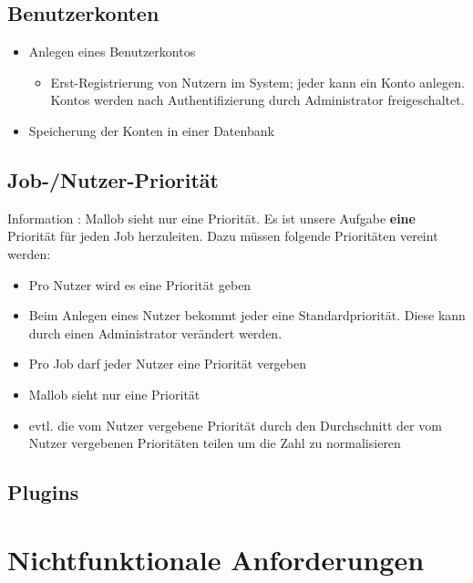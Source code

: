 
\subsection{Benutzerkonten}

\begin{itemize}
    \item Anlegen eines Benutzerkontos
    \begin{itemize}
        \item Erst-Registrierung von Nutzern im System; jeder kann ein Konto anlegen. Kontos werden nach Authentifizierung durch Administrator freigeschaltet.
    \end{itemize}
    \item Speicherung der Konten in einer Datenbank
\end{itemize}



\subsection{Job-/Nutzer-Priorität}
Information : Mallob sieht nur eine Priorität. Es ist unsere Aufgabe \textbf{eine} Priorität für jeden Job herzuleiten. Dazu müssen folgende Prioritäten vereint werden: 
\begin{itemize}
    \item Pro Nutzer wird es eine Priorität geben 
    \item Beim Anlegen eines Nutzer bekommt jeder eine Standardpriorität. Diese kann durch einen Administrator verändert werden.
    \item Pro Job darf jeder Nutzer eine Priorität vergeben
    \item Mallob sieht nur eine Priorität
    \item evtl. die vom Nutzer vergebene Priorität durch den Durchschnitt der vom Nutzer vergebenen Prioritäten teilen um die Zahl zu normalisieren
\end{itemize}



\subsection{Plugins}
\section{Nichtfunktionale Anforderungen}